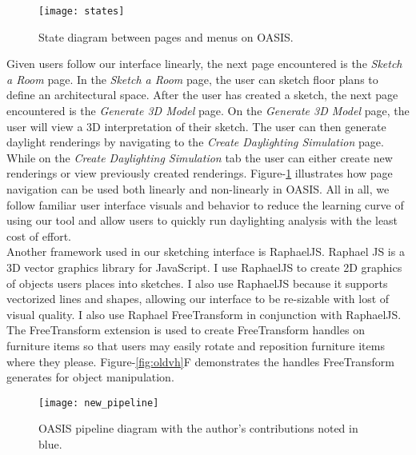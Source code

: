 		\begin{figure}[h]
		\centering
		\texttt{[image: states]}
		\caption{State diagram between pages and menus on OASIS.}
		\label{fig:states}
		\end{figure}

		Given users follow our interface linearly, the next page encountered is the \textit{Sketch a Room} page. 
		In the \textit{Sketch a Room} page, the user can sketch floor plans to define an architectural space.
		After the user has created a sketch, the next page encountered is the \textit{Generate 3D Model} page. 
		On the \textit{Generate 3D Model} page, the user will view a 3D interpretation of their sketch. 
		The user can then generate daylight renderings by navigating to the \textit{Create Daylighting Simulation} page.
		While on the \textit{Create Daylighting Simulation} tab the user can either create new renderings or view previously created renderings.
		Figure-\ref{fig:states} illustrates how page navigation can be used both linearly and non-linearly in OASIS.
		All in all, we follow familiar user interface visuals and behavior to reduce the learning curve of using our tool and allow users to quickly run daylighting analysis with the least cost of effort.\\

		Another framework used in our sketching interface is RaphaelJS\cite{}.
		Raphael JS is a 3D vector graphics library for JavaScript. 
		I use RaphaelJS to create 2D graphics of objects users places into sketches. I also use RaphaelJS because it supports vectorized lines and shapes, allowing our interface  to be re-sizable with lost of visual quality.
		I also use Raphael FreeTransform in conjunction with RaphaelJS\cite{}. 
		The FreeTransform extension is used to create FreeTransform handles on furniture items so that users may easily rotate and reposition furniture items where they please.
		Figure-\ref{fig:oldvh}F demonstrates the handles FreeTransform generates for object manipulation.\\

		\begin{figure}[h]
		\centering
		\texttt{[image: new\_pipeline]}
		\caption{OASIS pipeline diagram with the author's contributions noted in blue.}
		\label{fig:new_pipeline}
		\end{figure}


